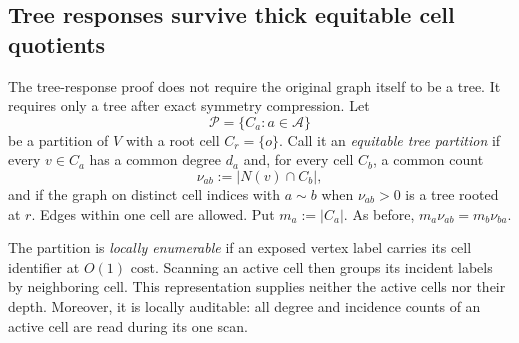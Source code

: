 \subsection{Tree responses survive thick equitable cell quotients}
\label{subsec:equitable-tree-quotients}

The tree-response proof does not require the original graph itself to be a
tree.  It requires only a tree after exact symmetry compression.  Let
\begin{equation}
 \mathcal P=\{C_a:a\in\mathcal A\}
 \label{eq:equitable-cell-partition}
\end{equation}
be a partition of $V$ with a root cell $C_r=\{o\}$.  Call it an
\emph{equitable tree partition} if every $v\in C_a$ has a common degree
$d_a$ and, for every cell $C_b$, a common count
\begin{equation}
 \nu_{ab}:=|N(v)\cap C_b|,
 \label{eq:equitable-cell-count}
\end{equation}
and if the graph on distinct cell indices with
$a\sim b$ when $\nu_{ab}>0$ is a tree rooted at $r$.  Edges within one cell
are allowed.  Put $m_a:=|C_a|$.  As before,
$m_a\nu_{ab}=m_b\nu_{ba}$.

The partition is \emph{locally enumerable} if an exposed vertex label carries
its cell identifier at $O(1)$ cost.  Scanning an active cell then groups its
incident labels by neighboring cell.  This representation supplies neither
the active cells nor their depth.  Moreover, it is locally auditable: all
degree and incidence counts of an active cell are read during its one scan.

